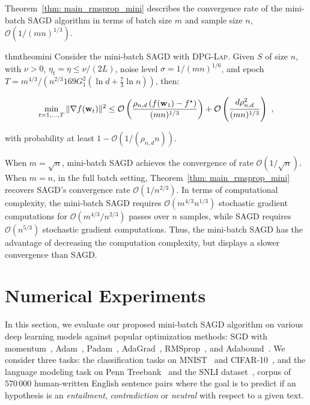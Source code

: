 \documentclass[11pt]{article}
\begin{document}
Theorem~\ref{thm: main_rmsprop_mini} 
describes the convergence rate of the mini-batch \textsc{SAGD} algorithm in terms of batch size $m$ and sample size $n$, \ie $\mathcal{O}(1/(mn)^{1/3})$.
\begin{restatable}{thm}{theomini}
\label{thm: main_rmsprop_mini}
Consider the mini-batch \textsc{SAGD} with \textsc{DPG-Lap}. 
Given $S$ of size $n$, with $\nu >0$, $\eta_t = \eta \leq \nu/(2L)$, noise level $\sigma = 1/(mn)^{1/6}$, and epoch $T = m^{4/3}/\left(n^{2/3}169G_1^2(\ln d + \frac{7}{3}\ln n)\right)$, then:
 \begin{small}
\begin{equation*}
\begin{split}
 \min_{t = 1,..., T}\|\nabla f(\mathbf{w}_t)\|^2 
 \leq\mathcal{O} \left( \frac{\rho_{n,d} \left(f(\mathbf{w}_1) - f^\star \right)}{(mn)^{1/3}} \right)+\mathcal{O} \left( \frac{d \rho_{n,d}^2}{(mn)^{1/3}}\right)~,
 \end{split}
\end{equation*}
\end{small}
with probability at least $1-\mathcal{O} \left(1/(\rho_{n,d} n)\right)$.
\end{restatable}
When $m = \sqrt{n}$, mini-batch \textsc{SAGD} achieves the convergence of rate $\mathcal{O}(1/\sqrt{n})$. When $m=n$, \ie in the full batch setting, Theorem~\ref{thm: main_rmsprop_mini} recovers \textsc{SAGD}'s convergence rate  $\mathcal{O}(1/n^{2/3})$. 
In terms of computational complexity, the mini-batch \textsc{SAGD} requires $\mathcal{O}(m^{4/3}n^{1/3})$ stochastic gradient computations for $\mathcal{O}(m^{4/3}/n^{2/3})$ passes over $n$ samples, while \textsc{SAGD} requires $\mathcal{O}(n^{5/3})$ stochastic gradient computations. 
Thus, the mini-batch \textsc{SAGD} has the advantage of decreasing the computation complexity, but displays a slower convergence than \textsc{SAGD}.





\section{Numerical Experiments} \label{sec: experiment}


In this section, we evaluate our proposed mini-batch \textsc{SAGD} algorithm on various deep learning models against popular optimization methods: SGD with momentum~\citep{qian1999momentum}, Adam~\citep{kiba15}, Padam~\citep{chgu2018},  AdaGrad~\citep{duha11},  RMSprop~\citep{tige12}, and Adabound~\citep{luxi2019}. 
We consider three tasks: the classification tasks on MNIST~\citep{lebo1998} and CIFAR-10~\citep{krhi2009}, and the language modeling task on Penn Treebank~\citep{mama1993} and the SNLI dataset~\citep{bowman2015large}, corpus of $570 \, 000$ human-written English sentence pairs where the goal is to predict if an hypothesis is an \emph{entailment}, \emph{contradiction} or \emph{neutral} with respect to a given text.
\end{document}
